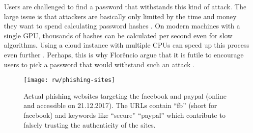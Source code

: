 Users are challenged to find a password that withstands this kind of attack. The large issue is that attackers are basically only limited by the time and money they want to spend calculating password hashes \cite{Block2017EconomicsOfflineCracking}. On modern machines with a single GPU, thousands of hashes can be calculated per second even for slow algorithms. Using a cloud instance with multiple CPUs can speed up this process even further . Perhaps, this is why Florêncio \etal argue that it is futile to encourage users to pick a password that would withstand such an attack \cite{Florencio2014AdministratorsGuide, Florencio2016CommACM}. 

\begin{figure}[!ht]
	\centering
	\texttt{[image: rw/phishing-sites]}
	\caption{\label{fig:rw:phishingsite} Actual phishing websites targeting the facebook and paypal (online and accessible on 21.12.2017). The URLs contain ``fb'' (short for facebook) and keywords like ``secure'' ``paypal'' which contribute to falsely trusting the authenticity of the sites.}
\end{figure}

